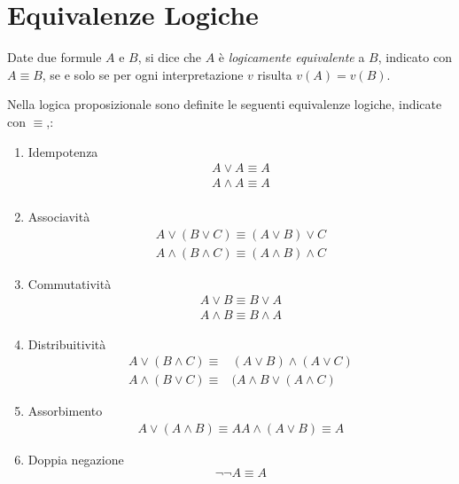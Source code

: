 \section{Equivalenze Logiche}
\begin{defi}
Date due formule $A$ e $B$, si dice che $A$ è \emph{logicamente equivalente} a $B$,
indicato con $A \equiv B$, se e solo se per ogni interpretazione $v$ risulta $v(A) = v(B)$.
\end{defi}

Nella logica proposizionale sono definite le seguenti equivalenze logiche, indicate con $\equiv$,:
\begin{enumerate}
    \item Idempotenza
            \begin{align*}
                A \lor A  \equiv  A \\
                A \land A  \equiv  A \\
            \end{align*}
    \item Associavità
            \begin{align*}
                A \lor (B \lor C) \equiv  (A \lor B) \lor C \\
                A \land (B \land C)  \equiv  (A \land B) \land C
            \end{align*}
    \item Commutatività
            \begin{align*}
                A \lor B  \equiv  B \lor A \\
                A \land B  \equiv  B \land A
            \end{align*}
    \item Distribuitività
            \begin{align*}
                A \lor (B \land C)  \equiv & (A \lor B) \land (A \lor C)\\
                A \land (B \lor C)  \equiv & (A \land B \lor (A \land C)
            \end{align*}
    \item Assorbimento
            \begin{align*}
                A \lor (A \land B)  \equiv  A
                A \land (A \lor B)  \equiv  A
            \end{align*}
    \item Doppia negazione
                \begin{equation*}
                    \neg \neg A \equiv A
                \end{equation*}

\end{enumerate}
